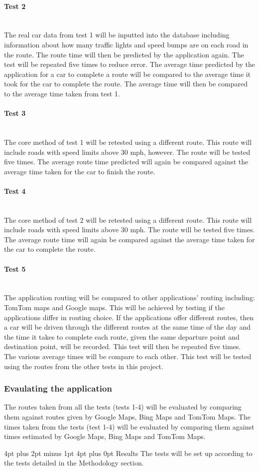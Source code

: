 \documentclass[12pt,a4paper]{article}
\makeatletter
\renewcommand\section{\@startsection {section}{1}{0mm} %
                               {4pt plus 2pt minus 1pt} %
                               {4pt plus 0pt} %
                               {\Large\bfseries}}
\newcommand{\myparagraph}[1]{\paragraph{#1}\mbox{}\\}
\makeatother
\begin{document}
\myparagraph{Test 2}
The real car data from test 1 will be inputted into the database including information about how many traffic lights and speed bumps are on each road in the route. The route time will then be predicted by the application again. The test will be repeated five times to reduce error. The average time predicted by the application for a car to complete a route will be compared to the average time it took for the car to complete the route. The average time will then be compared to the average time taken from test 1. 

\myparagraph{Test 3}
The core method of test 1 will be retested using a different route. This route will include roads with speed limits above 30 mph, however. The route will be tested five times. The average route time predicted will again be compared against the average time taken for the car to finish the route.

\myparagraph{Test 4}
The core method of test 2 will be retested using a different route. This route will include roads with speed limits above 30 mph. The route will be tested five times. The average route time will again be compared against the average time taken for the car to complete the route.  

\myparagraph{Test 5}
The application routing will be compared to other applications' routing including: TomTom maps and Google maps. This will be achieved by testing if the applications differ in routing choice. If the applications offer different routes, then a car will be driven through the different routes at the same time of the day and the time it takes to complete each route, given the same departure point and destination point, will be recorded. This test will then be repeated five times. The various average times will be compare to each other. This test will be tested using the routes from the other tests in this project.

\subsubsection{Evaulating the application}

The routes taken from all the tests (tests 1-4) will be evaluated by comparing them against routes given by Google Maps, Bing Maps and TomTom Maps.
The times taken from the tests (test 1-4) will be evaluated by comparing them against times estimated by Google Maps, Bing Maps and TomTom Maps.

\section{Results}
The tests will be set up according to the tests detailed in the Methodology section.
\end{document}
